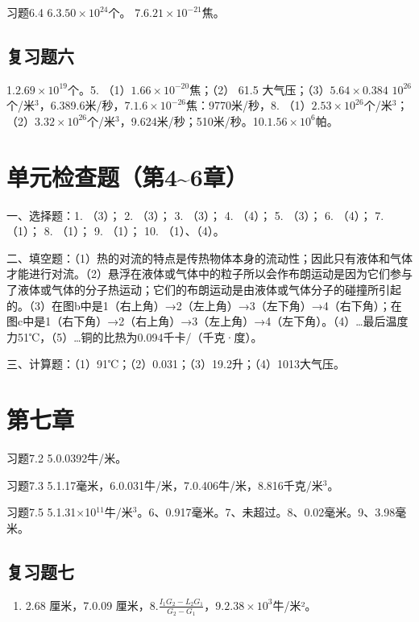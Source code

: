 习题6.4 6.\(3.50 \times 10^{24}\)个。 7.\(6.21 \times 10^{-21}\)焦。

\subsection{复习题六}\label{ux590dux4e60ux9898ux516d-1}

1.\(2.69 \times 10^{19}\)个。5. （1）\(1.66 \times 10^{-20}\)焦；（2）
61.5 大气压；（3）\(5.64 \times 0.384\)
\(10^{26}\)个/米\(^{3}\)，6.389.6米/秒，7.\(1.6 \times 10^{-26}\)焦：9770米/秒，8.
（1）\(2.53 \times 10^{26}\)个/米\(^{3}\)；（2）\(3.32 \times 10^{26}\)个/米\(^{3}\)，9.624米/秒；510米/秒。10.\(1.56 \times 10^{6}\)帕。

\section{单元检查题（第4\textasciitilde6章）}\label{ux5355ux5143ux68c0ux67e5ux9898ux7b2c46ux7ae0}

一、选择题：1. （3）； 2. （3）； 3. （3）； 4. （4）； 5. （3）； 6.
（4）； 7. （1）； 8. （1）； 9. （1）； 10. （1）、（4）。

二、填空题：（1）热的对流的特点是传热物体本身的流动性；因此只有液体和气体才能进行对流。（2）悬浮在液体或气体中的粒子所以会作布朗运动是因为它们参与了液体或气体的分子热运动；它们的布朗运动是由液体或气体分子的碰撞所引起的。（3）在图b中是1（右上角）→2（左上角）→3（左下角）→4（右下角）；在图c中是1（右下角）→2（右上角）→3（左上角）→4（左下角）。（4）\ldots 最后温度力51℃，（5）\ldots 铜的比热为0.094千卡/（千克·度）。

三、计算题：（1）91℃；（2）0.031；（3）19.2升；（4）1013大气压。

\section{第七章}\label{ux7b2cux4e03ux7ae0}

习题7.2 5.0.0392牛/米。

习题7.3 5.1.17毫米，6.0.031牛/米，7.0.406牛/米，8.816千克/米\(^{3}\)。

习题7.5
5.1.31×10\(^{11}\)牛/米\(^{3}\)。6、0.917毫米。7、未超过。8、0.02毫米。9、3.98毫米。

\subsection{复习题七}\label{ux590dux4e60ux9898ux4e03-1}

\begin{enumerate}
\def\labelenumi{\arabic{enumi}.}
\setcounter{enumi}{5}
\tightlist
\item
  2.68 厘米，7.0.09
  厘米，8.\(\frac{I_1G_2 - L_2G_1}{G_2 - G_1}\)，9.\(2.38 \times 10^3\)牛/米²。
\end{enumerate}

